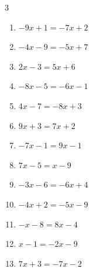 \begin{multicols}{3}
\begin{enumerate}

  \item $-9x+1=-7x+2$


  \item $-4x-9=-5x+7$

        \phantom{$\displaystyle x=16$}

  \item $2x-3=5x+6$

        \phantom{$\displaystyle x=-3$}

  \item $-8x-5=-6x-1$

        \phantom{$\displaystyle x=-2$}

  \item $4x-7=-8x+3$


  \item $9x+3=7x+2$


  \item $-7x-1=9x-1$

        \phantom{$\displaystyle x=0$}

  \item $7x-5=x-9$


  \item $-3x-6=-6x+4$


  \item $-4x+2=-5x-9$

        \phantom{$\displaystyle x=-11$}

  \item $-x-8=8x-4$


  \item $x-1=-2x-9$


  \item $7x+3=-7x-2$


\end{enumerate}
\end{multicols}

